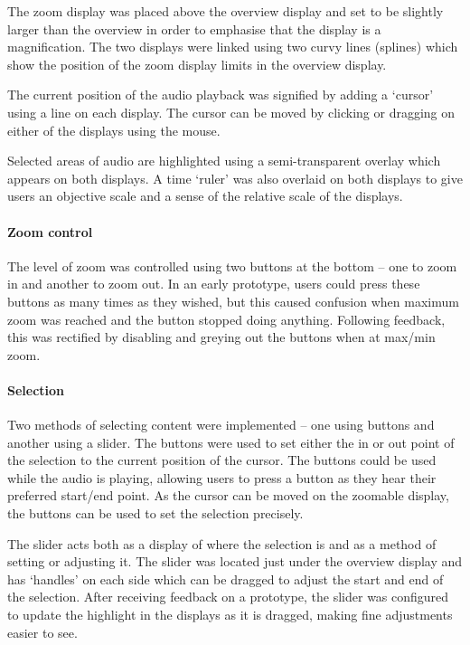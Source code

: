 The zoom display was placed above the overview display and set to be slightly
larger than the overview in order to emphasise that the display is a
magnification. The two displays were linked using two curvy lines (splines)
which show the position of the zoom display limits in the overview display.

The current position of the audio playback was signified by adding a `cursor'
using a line on each display. The cursor can be moved by clicking or dragging
on either of the displays using the mouse.

Selected areas of audio are highlighted using a semi-transparent overlay which
appears on both displays.  A time `ruler' was also overlaid on both displays to
give users an objective scale and a sense of the relative scale of the
displays.

\paragraph{Zoom control}
The level of zoom was controlled using two buttons at the bottom -- one to zoom
in and another to zoom out. In an early prototype, users could press these
buttons as many times as they wished, but this caused confusion when maximum
zoom was reached and the button stopped doing anything. Following feedback,
this was rectified by disabling and greying out the buttons when at max/min
zoom.

\paragraph{Selection}
Two methods of selecting content were implemented -- one using buttons and
another using a slider. The buttons were used to set either the in or out point
of the selection to the current position of the cursor. The buttons could be
used while the audio is playing, allowing users to press a button as they hear
their preferred start/end point. As the cursor can be moved on the zoomable
display, the buttons can be used to set the selection precisely.

The slider acts both as a display of where the selection is and as a method of
setting or adjusting it. The slider was located just under the overview display
and has `handles' on each side which can be dragged to adjust the start and end
of the selection. After receiving feedback on a prototype, the slider was
configured to update the highlight in the displays as it is dragged, making
fine adjustments easier to see.

